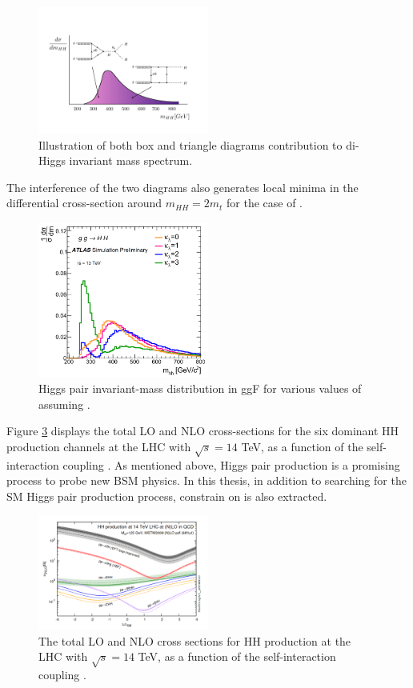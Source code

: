 \begin{figure}[htbp]
    \centering
    \includegraphics[width=0.5\textwidth]{Ch1/Img/illustration_mHH.jpeg}
    \caption{Illustration of both box and triangle diagrams contribution to di-Higgs invariant mass spectrum.}
    \label{fig:chap1:HH:BSM:I}
\end{figure}
The interference of the two diagrams also generates local minima in the differential cross-section around $m_{HH}=2m_t$ for the case of .
\begin{figure}[htbp]
    \centering
    \includegraphics[width=0.5\textwidth]{Ch1/Img/mHH.png}
    \caption{Higgs pair invariant-mass distribution in ggF for various values of \kl assuming .}
    \label{fig:chap1:HH:BSM:MHH}
\end{figure}
Figure \ref{fig:chap1:HH:BSM:XSEC:L} displays the total LO and NLO cross-sections for the six dominant HH production channels at the LHC with $\sqrt{s}=14$ TeV, as a function of the self-interaction coupling \kl.  As mentioned above, Higgs pair production is a promising process to probe new BSM physics. In this thesis, in addition to searching for the SM Higgs pair production process, constrain on \kl is also extracted.
\begin{figure}[htbp]
    \centering
    \includegraphics[width=0.5\textwidth]{Ch1/Img/HH_Xsec_as_lambda.png}
    \caption{The total LO and NLO cross sections for HH production at the LHC with $\sqrt{s}=14$ TeV, as a function of the self-interaction coupling \kl.}
    \label{fig:chap1:HH:BSM:XSEC:L}
\end{figure}

